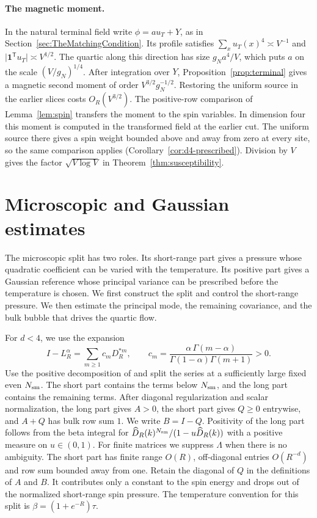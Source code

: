 \documentclass[11pt]{article}
\theoremstyle{definition}
\newcommand{\one}{\mathbf 1}
\begin{document}
\paragraph{The magnetic moment.}
In the natural terminal field write \(\phi=a u_T+Y\), as in
Section~\ref{sec:TheMatchingCondition}. Its profile satisfies
\(\sum_x u_T(x)^4\asymp V^{-1}\) and
\(\lvert\one^{\mathsf T}u_T\rvert\asymp V^{1/2}\).
The quartic along this direction has size \(g_N a^4/V\), which puts
\(a\) on the scale \((V/g_N)^{1/4}\). After integration over \(Y\),
Proposition~\ref{prop:terminal} gives a magnetic second moment of
order \(V^{3/2}g_N^{-1/2}\). Restoring the uniform source in the
earlier slices costs \(O_R(V^{3/2})\). The positive-row comparison of
Lemma~\ref{lem:spin} transfers the moment to the spin variables.
In dimension four this moment is computed in the transformed field
at the earlier cut. The uniform source there gives a spin weight
bounded above and away from zero at every site, so the same comparison
applies (Corollary~\ref{cor:d4-prescribed}). Division by \(V\) gives
the factor \(\sqrt{V\log V}\) in Theorem~\ref{thm:susceptibility}.

\setcounter{tocdepth}{1}
\tableofcontents

\section{Microscopic and Gaussian estimates}\label{sec:gaussian}

The microscopic split has two roles. Its short-range part gives a
pressure whose quadratic coefficient can be varied with the temperature.
Its positive part gives a Gaussian reference whose principal variance
can be prescribed before the temperature is chosen. We first construct
the split and control the short-range pressure. We then estimate the
principal mode, the remaining covariance, and the bulk bubble that
drives the quartic flow.

For \(d<4\), we use the expansion
\begin{equation}
 I-L_R^\alpha=\sum_{m\ge1} c_m D_R^{*m},\qquad
 c_m=\frac{\alpha\,\Gamma(m-\alpha)}
            {\Gamma(1-\alpha)\Gamma(m+1)}>0.
\end{equation}
Use the positive decomposition of \cite[Proposition~17.1]{IsingCorrelation}
and split the series at a sufficiently large fixed even
\(N_{\rm sm}\). The short part contains the terms below
\(N_{\rm sm}\), and the long part contains the remaining terms.
After diagonal regularization and scalar normalization, the long
part gives \(A>0\), the short part gives \(Q\ge0\) entrywise, and
\(A+Q\) has bulk row sum \(1\). We write \(B=I-Q\).
Positivity of the long part follows from the beta integral for
\(\widehat D_R(k)^{N_{\rm sm}}/(1-u\widehat D_R(k))\) with a
positive measure on \(u\in(0,1)\). For finite matrices we suppress
\(\Lambda\) when there is no ambiguity. The short part has finite
range \(O(R)\), off-diagonal entries \(O(R^{-d})\) and row sum
bounded away from one. Retain the diagonal of \(Q\) in the definitions of \(A\) and \(B\).
It contributes only a constant to the spin energy and drops out of
the normalized short-range spin pressure. The temperature convention
for this split is \(\beta=(1+e^{-R})\tau\).
\end{document}
